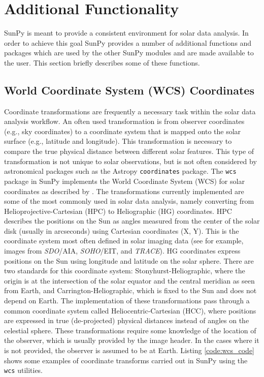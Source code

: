 \section{Additional Functionality}\label{sec:util}
SunPy is meant to provide a consistent environment for solar data analysis. In 
order to achieve this goal SunPy provides a number of additional functions and packages which 
are used by the other SunPy modules and are made available to the user. This section 
briefly describes some of these functions.
	
\subsection{World Coordinate System (WCS) Coordinates}\label{ssec:util:wcs}
Coordinate transformations are frequently a necessary task within the solar 
data analysis workflow. An often used transformation is from 
observer coordinates (e.g., sky coordinates) to a coordinate system that is 
mapped onto the solar surface (e.g., latitude and longitude). This 
transformation is necessary to compare the true physical distance between 
different solar features. This type of transformation is not unique
to solar observations, but is not often considered by astronomical packages
such as the Astropy 
\texttt{coordinates} package. The \texttt{wcs} package in SunPy implements the World Coordinate 
System (WCS) for solar coordinates as described by \cite{thompson2006}. The 
transformations currently implemented are some of the most commonly used in solar data analysis, namely converting from Helioprojective-Cartesian 
(HPC) to Heliographic (HG) coordinates. HPC describes the positions on 
the Sun as angles measured from the center of the solar disk (usually in 
arcseconds) using Cartesian coordinates (X, Y). This is the coordinate system 
most often defined in solar imaging data (see for example, images from 
\textit{SDO}/AIA, \textit{SOHO}/EIT, and \textit{TRACE}). 
HG coordinates express positions on the Sun using longitude and latitude on 
the solar sphere. There are two standards for this coordinate system:
Stonyhurst-Heliographic, where the origin is at the intersection of the solar 
equator and the central meridian as seen from Earth, and 
Carrington-Heliographic, which is fixed to the Sun and does not depend on Earth. The 
implementation of these transformations pass through a common coordinate system 
called Heliocentric-Cartesian (HCC), where positions are expressed in true 
(de-projected) physical distances instead of angles on the celestial sphere.
These transformations require some knowledge of the location of the observer, 
which is usually provided by the image header. In the cases where it is 
not provided, the observer is assumed to be at Earth. Listing \ref{code:wcs_code} shows 
some examples of coordinate transforms carried out in SunPy using the 
\texttt{wcs} utilities. 

